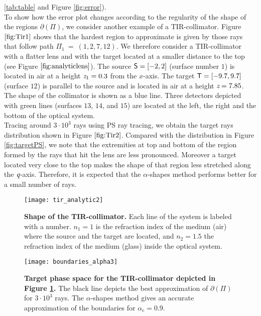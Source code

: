  \ref{tab:table} and Figure \ref{fig:error}).
 \\\indent To show how the error plot changes according to the regularity of the shape of the regions $\partial$$(\Pi)$, we consider another example of a TIR-collimator.
 Figure $\ref{fig:Tir1}$ shows that the hardest region to approximate is given by those rays that follow path $\Pi_1 ~=~ (1,2,7,12)$.
 We therefore consider a TIR-collimator with a flatter lens and with the target located at a smaller distance to the top (see Figure $\ref{fig:analyticlens}$). 
The source $\textsf{S}= [-2,2]$ (surface number $1$) is located in air at a height $\textit{z}_1 = 0.3$ from the $x$-axis.
       The target $\textsf{T}= [-9.7, 9.7]$ (surface $12$) is parallel to the source and is located in air at a height $ \textit{z}= 7.85$.
       The shape of the collimator is shown as a blue line.
       Three detectors depicted with green lines (surfaces $13$, $14$, and $15$) are located at the left, the right and the bottom of the optical system.
 \\ \indent Tracing around $3\cdot10^3$ rays using PS ray tracing, we obtain the target rays distribution shown in Figure $\ref{fig:Tir2}$. 
Compared with the distribution in Figure \ref{fig:targetPS}, we note that the extremities at top and bottom of the region formed by the rays that hit the lens are less pronounced.
Moreover a target located very close to the top makes the shape of that region less stretched along the $\textit{q}$-axis.
Therefore, it is expected that the $\alpha$-shapes method performs better for a small number of rays.
\begin{figure}[h]
  \begin{center}
  \texttt{[image: tir\_analytic2]}
   \end{center}
    \caption{\textbf{Shape of the TIR-collimator.} Each line of the system is labeled with a number.
       $n_1 = 1$ is the refraction index of the medium (air) where the source and the target are located, and
       $n_2 = 1.5 $ the refraction index of the medium (glass) inside the optical system.} 
 \label{fig:analyticlens}
\end{figure}
 \begin{figure}[h]
  \begin{center}
       \texttt{[image: boundaries\_alpha3]}
   \end{center}
        \caption{\textbf{Target phase space for the TIR-collimator depicted in
        Figure \ref{fig:analyticlens}.} The black line depicts the best approximation of $\partial$$(\Pi)$ for $3\cdot 10^3$ rays. 
The $\alpha$-shapes method gives an accurate approximation of the boundaries for $\alpha_\textrm{c} = 0.9$.}
  \label{fig:Tir2}
\end{figure}
